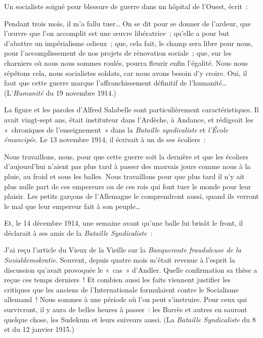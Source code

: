 \documentclass[french,twoside]{book} %
\newenvironment{quoteblock}%
  {\begin{quoting}}
  {\end{quoting}}
\newenvironment{quotebar}{%
    \def\FrameCommand{{\color{rubric!10!}\vrule width 0.5em} \hspace{0.9em}}%
    \def\OuterFrameSep{\itemsep} %
    \MakeFramed {\advance\hsize-\width \FrameRestore}
  }%
  {%
    \endMakeFramed
  }
\renewenvironment{quoteblock}%
  {%
    \savenotes
    \setstretch{0.9}
    \normalfont
    \begin{quotebar}
  }
  {%
    \end{quotebar}
    \spewnotes
  }
\begin{document}
\noindent Un socialiste soigné pour blessure de guerre dans un hôpital de l’Ouest, écrit :‌\par

\begin{quoteblock}
 \noindent Pendant trois mois, il m’a fallu tuer… On se dit pour se donner de l’ardeur, que l’œuvre que l’on accomplit est une œuvre libératrice ; qu’elle a pour but d’abattre un impérialisme odieux ; que, cela fait, le champ sera libre pour nous, pour l’accomplissement de nos projets de rénovation sociale ; que, sur les charniers où nous nous sommes roulés, pourra fleurir enfin l’égalité. Nous nous répétons cela, nous socialistes soldats, car nous avons besoin d’y croire. Oui, il faut que cette guerre marque l’affranchissement définitif de l’humanité… (L’{\itshape Humanité} du 19 novembre 1914.)‌
 \end{quoteblock}

\noindent La figure et les paroles d’Alfred Salabelle sont particulièrement caractéristiques. Il avait vingt-sept ans, était instituteur dans l’Ardèche, à Andance, et rédigeait les « chroniques de l’enseignement » dans la {\itshape Bataille syndicaliste} et {\itshape l’École émancipée}. Le 13 novembre 1914, il écrivait à un de ses écoliers :‌\par

\begin{quoteblock}
 \noindent Nous travaillons, nous, pour que cette guerre soit la dernière et que les écoliers d’aujourd’hui n’aient pas plus tard à passer des mauvais jours comme nous à la pluie, au froid et sous les balles. Nous travaillons pour que plus tard il n’y ait plus nulle part de ces empereurs ou de ces rois qui font tuer le monde pour leur plaisir. Les petits garçons de l’Allemagne le comprendront aussi, quand ils verront le mal que leur empereur fait à son peuple…‌
 \end{quoteblock}

\noindent Et, le 14 décembre 1914, une semaine avant qu’une balle lui brisât le front, il déclarait à ses amis de la {\itshape Bataille Syndicaliste} :‌\par

\begin{quoteblock}
 \noindent J’ai reçu l’article du Vieux de la Vieille sur la {\itshape Banqueroute frauduleuse de la Sozialdemokratie}. Souvent, depuis quatre mois m’était revenue à l’esprit la discussion qu’avait provoquée le « cas » d’Andler. Quelle confirmation sa thèse a reçue ces temps derniers ! Et combien aussi les faits viennent justifier les critiques que les anciens de l’Internationale formulaient contre le Socialisme allemand ! Nous sommes à une période où l’on peut s’instruire. Pour ceux qui survivront, il y aura de belles heures à passer : les Barrès et autres en sauront quelque chose, les Sudekum et leurs suiveurs aussi. (La {\itshape Bataille Syndicaliste} du 8 et du 12 janvier 1915.)‌
 \end{quoteblock}
\end{document}
